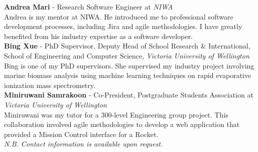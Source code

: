 \documentclass[9pt]{developercv}
\begin{document}
\textbf{Andrea Mari} - Research Software Engineer at \emph{NIWA} \\
Andrea is my mentor at NIWA. He introduced me to professional software development processes, including Jira and agile methodologies. I have greatly benefited from his industry expertise as a software developer. \\

\textbf{Bing Xue} - PhD Supervisor, Deputy Head of School Research \& International, School of Engineering and Computer Science, \emph{Victoria University of Wellington} \\
Bing is one of my PhD supervisors. She supervised my industry project involving marine biomass analysis using machine learning techniques on rapid evaporative ionization mass spectrometry. \\

\textbf{Miniruwani Samrakoon} - Co-President, Postgraduate Students Association at \emph{Victoria University of Wellington} \\
Miniruwani was my tutor for a 300-level Engineering group project. This collaboration involved agile methodologies to develop a web application that provided a Mission Control interface for a Rocket. \\

\emph{N.B. Contact information is available upon request.}





\end{document}
